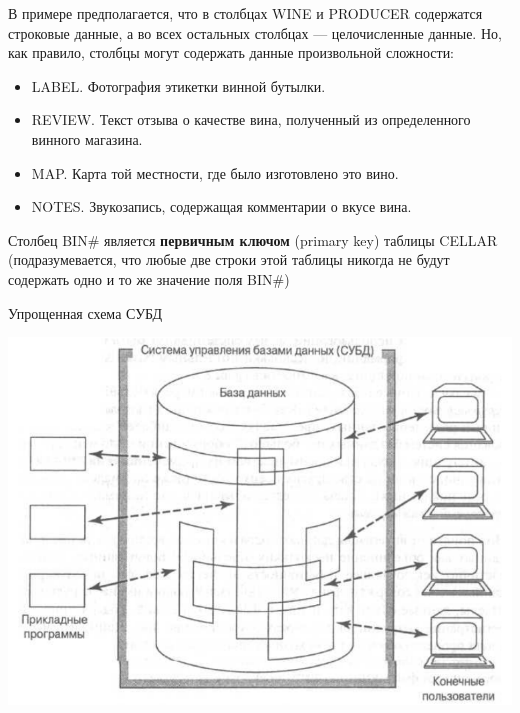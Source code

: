 \documentclass{beamer}
\begin{document}
\begin{frame}
В примере предполагается, что в столбцах WINE и PRODUCER содержатся строковые данные, а во всех остальных столбцах — целочисленные данные. Но, как правило, столбцы могут содержать
данные произвольной сложности:
\begin{itemize}
\item LABEL. Фотография этикетки винной бутылки.
\item REVIEW. Текст отзыва о качестве вина, полученный из определенного винного
магазина.
\item MAP. Карта той местности, где было изготовлено это вино.
\item NOTES. Звукозапись, содержащая комментарии о вкусе вина.
\end{itemize}
Столбец BIN\# является \textbf{первичным ключом} (primary key) таблицы CELLAR (подразумевается, что любые две строки этой таблицы никогда не будут содержать одно и то же значение поля BIN\#)
\end{frame}

\begin{frame}
\begin{block}{Упрощенная схема СУБД}
\begin{center}
\includegraphics[scale=0.5]{images/shema-01.png}
\end{center}
\end{block}
\end{frame}
\end{document}
